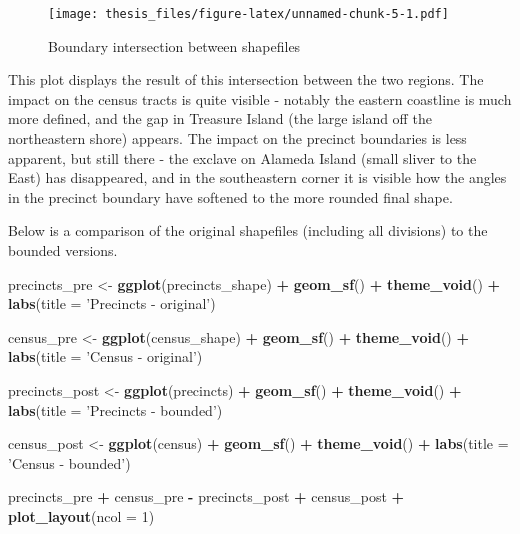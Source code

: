 \documentclass[12pt,twoside]{reedthesis}
\newenvironment{Shaded}{\begin{snugshade}}{\end{snugshade}}
\newcommand{\DataTypeTok}[1]{\textcolor[rgb]{0.13,0.29,0.53}{#1}}
\newcommand{\DecValTok}[1]{\textcolor[rgb]{0.00,0.00,0.81}{#1}}
\newcommand{\KeywordTok}[1]{\textcolor[rgb]{0.13,0.29,0.53}{\textbf{#1}}}
\newcommand{\NormalTok}[1]{#1}
\newcommand{\OperatorTok}[1]{\textcolor[rgb]{0.81,0.36,0.00}{\textbf{#1}}}
\newcommand{\StringTok}[1]{\textcolor[rgb]{0.31,0.60,0.02}{#1}}
\theoremstyle{definition}
\theoremstyle{definition}
\theoremstyle{definition}
\theoremstyle{remark}
\begin{document}
\begin{figure}
\centering
\texttt{[image: thesis\_files/figure-latex/unnamed-chunk-5-1.pdf]}
\caption{\label{fig:unnamed-chunk-5}Boundary intersection between
shapefiles}
\end{figure}
This plot displays the result of this intersection between the two
regions. The impact on the census tracts is quite visible - notably the
eastern coastline is much more defined, and the gap in Treasure Island
(the large island off the northeastern shore) appears. The impact on the
precinct boundaries is less apparent, but still there - the exclave on
Alameda Island (small sliver to the East) has disappeared, and in the
southeastern corner it is visible how the angles in the precinct
boundary have softened to the more rounded final shape.

Below is a comparison of the original shapefiles (including all
divisions) to the bounded versions.
\begin{Shaded}
\begin{Highlighting}[]
\NormalTok{precincts_pre <-}\StringTok{ }\KeywordTok{ggplot}\NormalTok{(precincts_shape) }\OperatorTok{+}\StringTok{ }\KeywordTok{geom_sf}\NormalTok{() }\OperatorTok{+}\StringTok{ }\KeywordTok{theme_void}\NormalTok{() }\OperatorTok{+}\StringTok{ }\KeywordTok{labs}\NormalTok{(}\DataTypeTok{title =} \StringTok{'Precincts - original'}\NormalTok{)}

\NormalTok{census_pre <-}\StringTok{ }\KeywordTok{ggplot}\NormalTok{(census_shape) }\OperatorTok{+}\StringTok{ }\KeywordTok{geom_sf}\NormalTok{() }\OperatorTok{+}\StringTok{ }\KeywordTok{theme_void}\NormalTok{() }\OperatorTok{+}\StringTok{ }\KeywordTok{labs}\NormalTok{(}\DataTypeTok{title =} \StringTok{'Census - original'}\NormalTok{)}

\NormalTok{precincts_post <-}\StringTok{ }\KeywordTok{ggplot}\NormalTok{(precincts) }\OperatorTok{+}\StringTok{ }\KeywordTok{geom_sf}\NormalTok{() }\OperatorTok{+}\StringTok{ }\KeywordTok{theme_void}\NormalTok{() }\OperatorTok{+}\StringTok{ }\KeywordTok{labs}\NormalTok{(}\DataTypeTok{title =} \StringTok{'Precincts - bounded'}\NormalTok{)}

\NormalTok{census_post <-}\StringTok{ }\KeywordTok{ggplot}\NormalTok{(census) }\OperatorTok{+}\StringTok{ }\KeywordTok{geom_sf}\NormalTok{() }\OperatorTok{+}\StringTok{ }\KeywordTok{theme_void}\NormalTok{() }\OperatorTok{+}\StringTok{ }\KeywordTok{labs}\NormalTok{(}\DataTypeTok{title =} \StringTok{'Census - bounded'}\NormalTok{)}

\NormalTok{precincts_pre }\OperatorTok{+}\StringTok{ }\NormalTok{census_pre }\OperatorTok{-}\StringTok{ }\NormalTok{precincts_post }\OperatorTok{+}\StringTok{ }\NormalTok{census_post }\OperatorTok{+}\StringTok{ }\KeywordTok{plot_layout}\NormalTok{(}\DataTypeTok{ncol =} \DecValTok{1}\NormalTok{)}
\end{Highlighting}
\end{Shaded}
\end{document}
